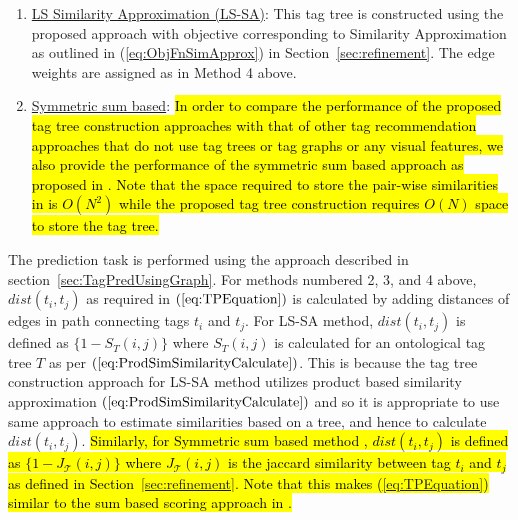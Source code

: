 \begin{enumerate}
\item \underline{LS Similarity Approximation (LS-SA)}:  This tag tree is constructed using the proposed approach with objective corresponding to Similarity Approximation as outlined in (\ref{eq:ObjFnSimApprox}) in Section~\ref{sec:refinement}. The edge weights are assigned as in Method 4 above. 

\item \underline{Symmetric sum based}: \hl{In order to compare the performance of the proposed tag tree construction approaches with that of other tag recommendation approaches that do not use tag trees or tag graphs or any visual features, we also provide the performance of the symmetric sum based approach as proposed in {\cite{sigurbjornsson2008flickr}}. Note that the space required to store the pair-wise similarities in {\cite{sigurbjornsson2008flickr}} is $O(N^2)$ while the proposed tag tree construction requires $O(N)$ space to store the tag tree. 
}





\end{enumerate}
The prediction task is performed using the approach described in section~\ref{sec:TagPredUsingGraph}. For methods numbered 2, 3, and 4 above, $dist(t_i, t_j)$ as required in $(\ref{eq:TPEquation})$ is calculated by adding distances of edges in path connecting tags $t_i$ and $t_j$. For LS-SA method, $dist(t_i, t_j)$ is defined as $\{1- S_T{(i,j)}    \}$ where $S_T{(i,j)}$ is calculated for an ontological tag tree $T$ as per $(\ref{eq:ProdSimSimilarityCalculate})$. This is because the tag tree construction approach for LS-SA method utilizes product based similarity approximation $(\ref{eq:ProdSimSimilarityCalculate})$ and so it is appropriate to use same approach to estimate similarities based on a tree, and hence to calculate $dist(t_i, t_j)$. \hl{Similarly, for Symmetric sum based method {\cite{sigurbjornsson2008flickr}}, $dist(t_i, t_j)$ is defined as $\{1- J_{\mathcal{T}}(i,j)    \}$ where $J_{\mathcal{T}}(i,j)$ is the jaccard similarity between tag $t_i$ and $t_j$ as defined in Section~{\ref{sec:refinement}}. Note that this makes ({\ref{eq:TPEquation}}) similar to the sum based scoring approach in {\cite{sigurbjornsson2008flickr}}. 
}

